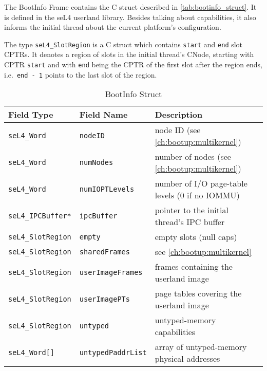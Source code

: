 The BootInfo Frame contains the C struct described in
\autoref{tab:bootinfo_struct}.
It is defined in the seL4 userland library. Besides talking about
capabilities, it also informs the initial thread about
the current platform's configuration.

The type \texttt{seL4\_SlotRegion} is a C struct
which contains \texttt{start} and \texttt{end} slot CPTRs. It denotes a region
of slots in the initial thread's CNode, starting with CPTR \texttt{start} and with
\texttt{end} being the CPTR of the first slot after the region ends, i.e.\
\texttt{end - 1} points to the last slot of the region.

\begin{table}[htb]
  \begin{center}
    \caption{BootInfo Struct}
    \label{tab:bootinfo_struct}
    \begin{tabularx}{\textwidth}{llX}
      \toprule
      Field Type & Field Name & Description \\
      \midrule
      \texttt{seL4\_Word}           & \texttt{nodeID}                  & node ID (see \autoref{ch:bootup:multikernel}) \\
      \texttt{seL4\_Word}           & \texttt{numNodes}                & number of nodes (see \autoref{ch:bootup:multikernel}) \\
      \texttt{seL4\_Word}           & \texttt{numIOPTLevels}           & number of I/O page-table levels (0 if no IOMMU) \\
      \texttt{seL4\_IPCBuffer*}     & \texttt{ipcBuffer}               & pointer to the initial thread's IPC buffer \\
      \texttt{seL4\_SlotRegion}     & \texttt{empty}                   & empty slots (null caps) \\
      \texttt{seL4\_SlotRegion}     & \texttt{sharedFrames}            & see \autoref{ch:bootup:multikernel} \\
      \texttt{seL4\_SlotRegion}     & \texttt{userImageFrames}         & frames containing the userland image \\
      \texttt{seL4\_SlotRegion}     & \texttt{userImagePTs}            & page tables covering the userland image \\
      \texttt{seL4\_SlotRegion}     & \texttt{untyped}                 & untyped-memory capabilities \\
      \texttt{seL4\_Word[]}         & \texttt{untypedPaddrList}        & array of untyped-memory physical addresses \\

\end{tabularx}
\end{center}
\end{table}
